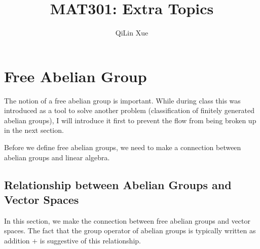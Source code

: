 \documentclass{article}
\title{MAT301: Extra Topics}
\author{QiLin Xue}
\begin{document}
\maketitle
\AddToShipoutPictureBG{\AtPageLowerLeft{%
        \color{blue2}\rule{.04\paperwidth}{\paperheight}}}

\tableofcontents
\newpage
\section{Free Abelian Group}
The notion of a free abelian group is important. While during class this was introduced as a tool to solve another problem (classification of finitely generated abelian groups), I will introduce it first to prevent the flow from being broken up in the next section.

Before we define free abelian groups, we need to make a connection between abelian groups and linear algebra.
\subsection{Relationship between Abelian Groups and Vector Spaces}
In this section, we make the connection between free abelian groups and vector spaces. The fact that the group operator of abelian groups is typically written as addition $+$ is suggestive of this relationship.
\end{document}
